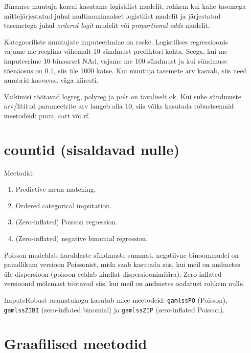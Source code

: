 \documentclass[]{book}
\begin{document}
Binaarse muutuja korral kasutame logistilist mudelit, rohkem kui kahe tasemega mittejärjestatud juhul multinominaalset logistilist mudelit ja järjestatud tasemetega juhul \emph{ordered logit} mudelit või \emph{proportional odds} mudelit.

Kategooriliste muutujate imputeerimine on raske. Logistilises regressioonis vajame me reeglina vähemalt 10 sündmust prediktori kohta. Seega, kui me imputeerime 10 binaarset NAd, vajame me 100 sündmust ja kui sündmuse tõenäosus on 0.1, siis üle 1000 katse. Kui muutuja tasemete arv kasvab, siis need numbrid kasvavad väga kiiresti.

Vaikimisi töötavad logreg, polyreg ja polr on tavaliselt ok. Kui suhe sündmuste arv/fititud parameetrite arv langeb alla 10, siis võiks kasutada robustsemaid meetodeid: pmm, cart või rf.

\hypertarget{countid-sisaldavad-nulle}{%
\section{countid (sisaldavad nulle)}\label{countid-sisaldavad-nulle}}

Meetodid:

\begin{enumerate}
\def\labelenumi{\arabic{enumi}.}
\item
  Predictive mean matching.
\item
  Ordered categorical imputation.
\item
  (Zero-inflated) Poisson regression.
\item
  (Zero-inflated) negative binomial regression.
\end{enumerate}

Poisson mudeldab haruldaste sündmuste summat, negatiivne binoommudel on paindlikum versioon Poissonist, mida saab kasutada siis, kui meil on andmetes üle-dispersioon (poisson eeldab kindlat dispersioonimäära). Zero-inflated versioonid mõlemast töötavad siis, kui meil on andmetes oodatust rohkem nulle.

ImputeRobust raamatukogu kasutab mice meetodeid: \texttt{gamlssPO} (Poisson), \texttt{gamlssZIBI} (zero-inflated binomial) ja \texttt{gamlssZIP} (zero-inflated Poisson).

\hypertarget{graafilised-meetodid}{%
\section{Graafilised meetodid}\label{graafilised-meetodid}}
\end{document}
